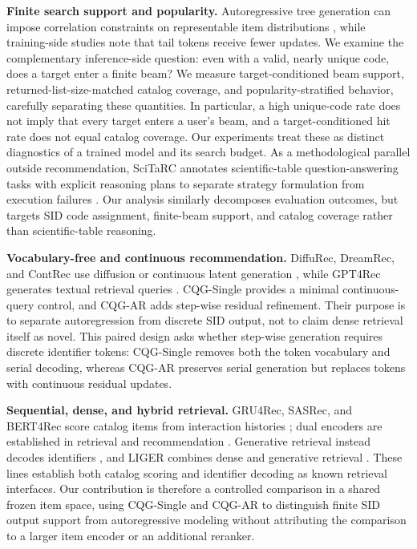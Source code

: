 \documentclass[preprint,12pt]{elsarticle}
\begin{document}
\textbf{Finite search support and popularity.}
Autoregressive tree generation can impose correlation constraints on
representable item distributions \citep{hou2026expressiveness}, while
training-side studies note that tail tokens receive fewer updates. We examine
the complementary inference-side question: even with a valid, nearly unique
code, does a target enter a finite beam? We measure target-conditioned beam
support, returned-list-size-matched catalog coverage, and popularity-stratified behavior,
carefully separating these quantities. In particular, a high unique-code rate
does not imply that every target enters a user's beam, and a target-conditioned
hit rate does not equal catalog coverage. Our experiments treat these as
distinct diagnostics of a trained model and its search budget.
As a methodological parallel outside recommendation, SciTaRC annotates
scientific-table question-answering tasks with explicit reasoning plans to
separate strategy formulation from execution failures
\citep{wang2026scitarc}. Our analysis similarly decomposes evaluation
outcomes, but targets SID code assignment, finite-beam support, and catalog
coverage rather than scientific-table reasoning.

\textbf{Vocabulary-free and continuous recommendation.}
DiffuRec, DreamRec, and ContRec use diffusion or continuous latent generation
\citep{10.1145/3631116,yang2023dreamrec,qu2026contrec}, while GPT4Rec generates
textual retrieval queries \citep{li2023gpt4recgenerativeframeworkpersonalized}. CQG-Single provides a minimal
continuous-query control, and CQG-AR adds step-wise residual refinement. Their
purpose is to separate autoregression from discrete SID output, not to claim
dense retrieval itself as novel. This paired design asks whether step-wise
generation requires discrete identifier tokens: CQG-Single removes both the
token vocabulary and serial decoding, whereas CQG-AR preserves serial
generation but replaces tokens with continuous residual updates.

\textbf{Sequential, dense, and hybrid retrieval.}
GRU4Rec, SASRec, and BERT4Rec score catalog items from interaction histories
\citep{hidasi2016gru4rec,kang2018sasrec,sun2019bert4rec}; dual encoders are
established in retrieval and recommendation
\citep{huang2013dssm,covington2016youtube}. Generative retrieval instead
decodes identifiers \citep{tay2022dsi,wang2022nci}, and LIGER combines dense
and generative retrieval \citep{yang2024liger}. These lines establish both
catalog scoring and identifier decoding as known retrieval interfaces.
Our contribution is therefore a controlled comparison in a shared frozen item
space, using CQG-Single and CQG-AR to distinguish finite SID output support
from autoregressive modeling without attributing the comparison to a larger
item encoder or an additional reranker.
\end{document}
